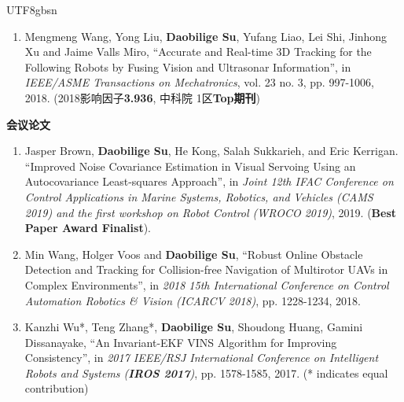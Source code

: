 \documentclass[margin,line]{res}
\begin{document}
\begin{CJK*}{UTF8}{gbsn}
\begin{resume}
\begin{enumerate}
\item Mengmeng Wang, Yong Liu, {\bf Daobilige Su}, Yufang Liao, Lei Shi, Jinhong Xu and Jaime Valls Miro, ``Accurate and Real-time 3D Tracking for the Following Robots by Fusing Vision and Ultrasonar Information'', in {\it IEEE/ASME Transactions on Mechatronics}, vol. 23 no. 3, pp. 997-1006, 2018. (2018影响因子\textbf{3.936}, 中科院 1区{\bf Top期刊})
\end{enumerate}

\textbf{会议论文}
\begin{enumerate}
\item Jasper Brown, \textbf{Daobilige Su}, He Kong, Salah Sukkarieh, and Eric Kerrigan. ``Improved Noise Covariance Estimation in Visual Servoing Using an Autocovariance Least-squares Approach'', in \textit{Joint 12th IFAC Conference on Control Applications in Marine Systems, Robotics, and Vehicles (CAMS 2019) and the first workshop on Robot Control (WROCO 2019)}, 2019. ({\bf Best Paper Award Finalist}).

\item Min Wang, Holger Voos and {\bf Daobilige Su}, ``Robust Online Obstacle Detection and Tracking for Collision-free Navigation of Multirotor UAVs in Complex Environments'', in {\it 2018 15th International Conference on Control Automation Robotics \& Vision (ICARCV 2018)}, pp. 1228-1234, 2018.

\item Kanzhi Wu*, Teng Zhang*, {\bf Daobilige Su}, Shoudong Huang, Gamini Dissanayake, ``An Invariant-EKF VINS Algorithm for Improving Consistency'', in {\it 2017 IEEE/RSJ International Conference on Intelligent Robots and Systems (\textbf{IROS 2017})}, pp. 1578-1585, 2017.
(* indicates equal contribution)


\end{enumerate}
\end{resume}
\end{CJK*}
\end{document}
